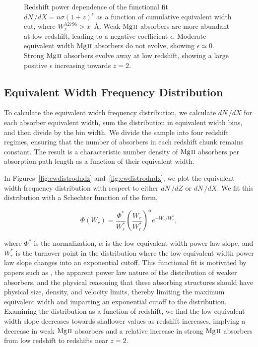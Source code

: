 \documentclass[iop,apj,numberedappendix,appendixfloats,twocolappendix]{emulateapj}
\begin{document}
\begin{figure}[bth]
\caption{Redshift power dependence of the functional fit $dN\,/dX = n\sigma (1 + z)^{\epsilon}$ as a function of cumulative equivalent width cut, where $W_r^{\lambda2796} > x$~{\AA}. Weak ${\hbox{{\rm Mg}\kern 0.1em{\sc ii}}}$ absorbers are more abundant at low redshift, leading to a negative coefficient $\epsilon$. Moderate equivalent width ${\hbox{{\rm Mg}\kern 0.1em{\sc ii}}}$ absorbers do not evolve, showing $\epsilon \simeq 0$. Strong ${\hbox{{\rm Mg}\kern 0.1em{\sc ii}}}$ absorbers evolve away at low redshift, showing a large positive $\epsilon$ increasing towards $z = 2$.}
\label{fig:epsilon}
\end{figure}

\subsection{Equivalent Width Frequency Distribution}
\label{sec:ewdistro}

To calculate the equivalent width frequency distribution, we calculate $dN\,/dX$ for each absorber equivalent width, sum the distribution in equivalent width bins, and then divide by the bin width. We divide the sample into four redshift regimes, ensuring that the number of absorbers in each redshift chunk remains constant. The result is a characteristic number density of ${\hbox{{\rm Mg}\kern 0.1em{\sc ii}}}$ absorbers per absorption path length as a function of their equivalent width.

In Figures~\ref{fig:ewdistrodndz} and~\ref{fig:ewdistrodndx}, we plot the equivalent width frequency distribution with respect to either $dN\,/dZ$ or $dN\,/dX$. We fit this distribution with a Schechter function of the form,

\begin{equation}
\Phi (W_r) = \frac{\Phi^*}{W_r^*} \left(\frac{W_r}{W_r^*}\right)^{\alpha} e^{-W_r / W_r^*} ,
\label{eqn:schechter}
\end{equation}

where $\Phi^*$ is the normalization, $\alpha$ is the low equivalent width power-law slope, and $W_r^*$ is the turnover point in the distribution where the low equivalent width power law slope changes into an exponential cutoff. This functional fit is motivated by papers such as \cite{Kacprzak2011}, the apparent power law nature of the distribution of weaker absorbers, and the physical reasoning that these absorbing structures should have physical size, density, and velocity limits, thereby limiting the maximum equivalent width and imparting an exponential cutoff to the distribution. Examining the distribution as a function of redshift, we find the low equivalent width slope decreases towards shallower values as redshift increases, implying a decrease in weak ${\hbox{{\rm Mg}\kern 0.1em{\sc ii}}}$ absorbers and a relative increase in strong ${\hbox{{\rm Mg}\kern 0.1em{\sc ii}}}$ absorbers from low redshift to redshifts near $z = 2$. 
\end{document}
